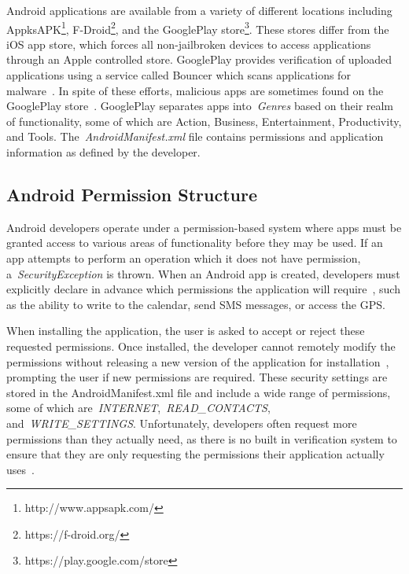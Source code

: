 \documentclass[conference]{IEEEtran}
\begin{document}
Android applications are available from a variety of different locations including AppksAPK\footnote{http://www.appsapk.com/}, F-Droid\footnote{https://f-droid.org/}, and the GooglePlay store\footnote{https://play.google.com/store}. These stores differ from the iOS app store, which forces all non-jailbroken devices to access applications through an Apple controlled store. GooglePlay provides verification of uploaded applications using a service called Bouncer which scans applications for malware~\cite{bouncer_url1}. In spite of these efforts, malicious apps are sometimes found on the GooglePlay store~\cite{Zhou:2012:DAM:2310656.2310710}. GooglePlay separates apps into~\emph{Genres} based on their realm of functionality, some of which are Action, Business, Entertainment, Productivity, and Tools. The~\emph{AndroidManifest.xml} file contains permissions and application information as defined by the developer.

\subsection{Android Permission Structure}
Android developers operate under a permission-based system where apps must be granted access to various areas of functionality before they may be used. If an app attempts to perform an operation which it does not have permission, a~\emph{SecurityException} is thrown. When an Android app is created, developers must explicitly declare in advance which permissions the application will require~\cite{Felt:2011:APD:2046707.2046779}, such as the ability to write to the calendar, send SMS messages, or access the GPS.

When installing the application, the user is asked to accept or reject these requested permissions. Once installed, the developer cannot remotely modify the permissions without releasing a new version of the application for installation~\cite{shaerpour2013trends}, prompting the user if new permissions are required. These security settings are stored in the AndroidManifest.xml file and include a wide range of permissions, some of which are~\emph{INTERNET},~\emph{READ\_CONTACTS}, and~\emph{WRITE\_SETTINGS}. Unfortunately, developers often request more permissions than they actually need, as there is no built in verification system to ensure that they are only requesting the permissions their application actually uses~\cite{Felt:2011:APD:2046707.2046779}.
\end{document}
